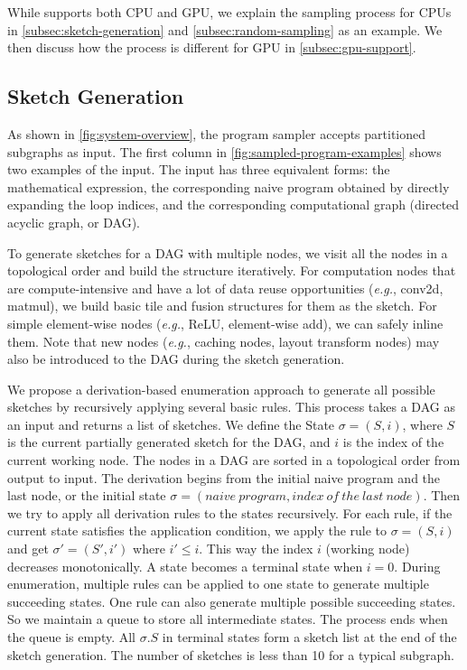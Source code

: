 While \Ansor supports both CPU and GPU, we explain the sampling process for CPUs in \autoref{subsec:sketch-generation} and \autoref{subsec:random-sampling} as an example.
We then discuss how the process is different for GPU in \autoref{subsec:gpu-support}.

\subsection{Sketch Generation}
\label{subsec:sketch-generation}
As shown in \autoref{fig:system-overview}, the program sampler accepts partitioned subgraphs as input.
The first column in \autoref{fig:sampled-program-examples} shows two examples of the input.
The input has three equivalent forms: the mathematical expression, the corresponding naive program obtained by directly expanding the loop indices, and the corresponding computational graph (directed acyclic graph, or DAG).

To generate sketches for a DAG with multiple nodes, we visit all the nodes in a topological order and build the structure iteratively.
For computation nodes that are compute-intensive and have a lot of data reuse opportunities (\textit{e.g.}, conv2d, matmul), we build basic tile and fusion structures for them as the sketch.
For simple element-wise nodes (\textit{e.g.}, ReLU, element-wise add), we can safely inline them.
Note that new nodes (\textit{e.g.}, caching nodes, layout transform nodes) may also be introduced to the DAG during the sketch generation.

We propose a derivation-based enumeration approach to generate all possible sketches by recursively applying several basic rules.
This process takes a DAG as an input and returns a list of sketches.
We define the State $\sigma = (S, i)$, where $S$ is the current partially generated sketch for the DAG, and $i$ is the index of the current working node.
The nodes in a DAG are sorted in a topological order from output to input.
The derivation begins from the initial naive program and the last node, or the initial state $\sigma = (naive\ program, index\ of \ the\ last\ node)$.
Then we try to apply all derivation rules to the states recursively.
For each rule, if the current state satisfies the application condition, we apply the rule to $\sigma = (S, i)$ and get $\sigma' = (S', i')$ where $i' \le i$.
This way the index $i$ (working node) decreases monotonically.
A state becomes a terminal state when $i = 0$.
During enumeration, multiple rules can be applied to one state to generate multiple succeeding states. One rule can also generate multiple possible succeeding states. So we maintain a queue to store all intermediate states. The process ends when the queue is empty.
All $\sigma.S$ in terminal states form a sketch list at the end of the sketch generation. The number of sketches is less than 10 for a typical subgraph.

